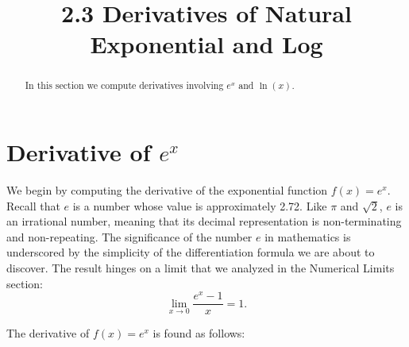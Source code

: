 \documentclass[handout]{ximera}
\title{2.3 Derivatives of Natural Exponential and Log}
\begin{document}
\begin{abstract}
In this section we compute derivatives involving $e^x$ and $\ln(x)$.
\end{abstract}

\maketitle


\begin{image}
\end{image}

\section{Derivative of $e^x$}

We begin by computing the derivative of the exponential function $f(x) = e^x$.  
Recall that $e$ is a number whose value is approximately 2.72.
Like $\pi$ and $\sqrt 2$, $e$ is an irrational number, meaning that its decimal representation 
is non-terminating and non-repeating. The significance of the number $e$ in mathematics
is underscored by the simplicity of the differentiation formula we are about to discover. 
The result hinges on a limit that we analyzed in the Numerical Limits section:
\[
\lim_{x \to 0} \frac{e^x - 1}{x} = 1.
\]

The derivative of $f(x) = e^x$ is found as follows:
\end{document}
